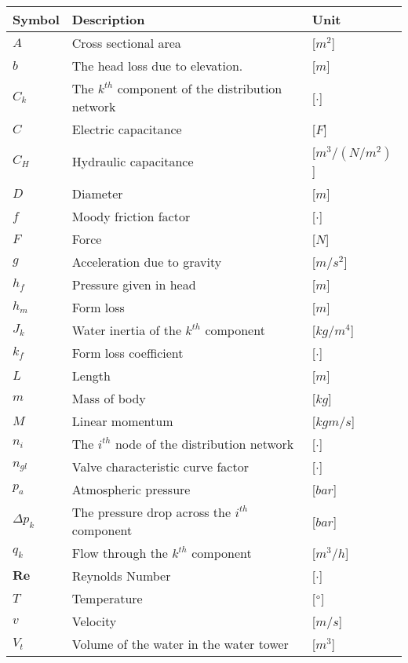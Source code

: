 \begin{tabular}{l l l} 
	\textbf{Symbol}		&	\textbf{Description}										& \textbf{Unit}	\\\hline
	$A$					&	Cross sectional area									    & [$m^2$]\\
	$b$					&	The head loss due to elevation. 						    & [$m$]\\
	$C_k$				&	The $k^{th}$ component of the distribution network     		& [$\cdot$]\\
	$C$					&	Electric capacitance								   		& [$F$]\\
	$C_H$				&	Hydraulic capacitance								   		& [$m^3/(N/m^2)$]\\
	$D$					&	Diameter									     			& [$m$]\\
	$f$					&	Moody friction factor									    & [$\cdot$]\\
	$F$					&	Force									     				& [$N$]\\
	$g$					&	Acceleration due to gravity									& [$m/s^2$]\\
	$h_f$				&	Pressure given in head									    & [$m$]\\
	$h_m$				&	Form loss									    			& [$m$]\\
	$J_k$				&	Water inertia of the $k^{th}$ component						& [$kg/m^4$]\\
	$k_f$				&	Form loss coefficient								    	& [$\cdot$]\\
	$L$					&	Length									     				& [$m$]\\
	$m$					&	Mass of body									     		& [$kg$]\\
	$M$					&	Linear momentum									     		& [$kgm/s$]\\
	$n_i$				&	The $i^{th}$ node of the distribution network     			& [$\cdot$]\\
	$n_{gl}$			&	Valve characteristic curve factor							& [$\cdot$]\\
	$p_a$				&	Atmospheric pressure							      		& [$bar$]\\
	$\Delta p_k$		&	The pressure drop across the $i^{th}$ component      		& [$bar$]\\
	$q_k$				&	Flow through the $k^{th}$ component 		     			& [$m^3/h$]\\
	$\bm{Re}$			&	Reynolds Number								     			& [$\cdot$]\\
	$T$					&	Temperature									     			& [$\degree$]\\
	$v$					&	Velocity									     			& [$m/s$]\\
	$V_t$				&	Volume of the water in the water tower						& [$m^3$]\\

\end{tabular}
